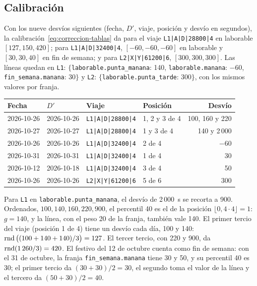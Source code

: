 \subsection{Calibración} Con los nueve desvíos siguientes (fecha, $D'$, viaje, posición y desvío en segundos), la
calibración~\eqref{eq:correccion-tablas} da para el viaje \texttt{L1|A|D|28800|4} en laborable $[127,150,420]$; para
\texttt{L1|A|D|32400|4}, $[-60,-60,-60]$ en laborable y $[30,30,40]$ en fin de semana; y para
\texttt{L2|X|Y|61200|6}, $[300,300,300]$. Las líneas quedan en \texttt{L1}: $\{$\texttt{laborable.punta\_manana}: 140,
\texttt{laborable.manana}: $-60$, \texttt{fin\_semana.manana}: 30$\}$ y \texttt{L2}:
$\{$\texttt{laborable.punta\_tarde}: 300$\}$, con los mismos valores por franja.

\begin{center}
\small
\begin{tabular}{@{}llllr@{}}
\toprule
Fecha & $D'$ & Viaje & Posición & Desvío\\
\midrule
2026-10-26 & 2026-10-26 & \texttt{L1|A|D|28800|4} & 1, 2 y 3 de 4 & 100, 160 y 220\\
2026-10-27 & 2026-10-27 & \texttt{L1|A|D|28800|4} & 1 y 3 de 4 & 140 y 2\,000\\
2026-10-26 & 2026-10-26 & \texttt{L1|A|D|32400|4} & 2 de 4 & $-60$\\
2026-10-31 & 2026-10-31 & \texttt{L1|A|D|32400|4} & 1 de 4 & 30\\
2026-10-12 & 2026-10-18 & \texttt{L1|A|D|32400|4} & 3 de 4 & 50\\
2026-10-26 & 2026-10-26 & \texttt{L2|X|Y|61200|6} & 5 de 6 & 300\\
\bottomrule
\end{tabular}
\end{center}

\noindent Para \texttt{L1} en \texttt{laborable.punta\_manana}, el desvío de 2\,000~s se recorta a 900. Ordenados,
$100,140,160,220,900$, el percentil 40 es el de la posición $\lfloor0{,}4\cdot4\rfloor=1$: $g=140$, y la línea, con el
peso 20 de la franja, también vale 140. El primer tercio del viaje (posición 1 de 4) tiene un desvío cada día, 100 y
140: $\operatorname{rnd}\big((100+140+140)/3\big)=127$. El tercer tercio, con 220 y 900, da $\operatorname{rnd}(1\,260/3)=420$. El
festivo del 12 de octubre cuenta como fin de semana: con el 31 de octubre, la franja \texttt{fin\_semana.manana} tiene
30 y 50, y su percentil 40 es 30; el primer tercio da $(30+30)/2=30$, el segundo toma el valor de la línea y el tercero
da $(50+30)/2=40$.

